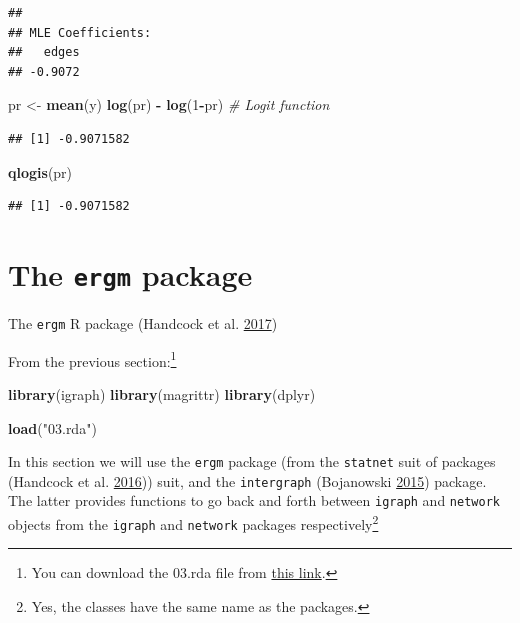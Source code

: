 \documentclass[]{book}
\newenvironment{Shaded}{\begin{snugshade}}{\end{snugshade}}
\newcommand{\KeywordTok}[1]{\textcolor[rgb]{0.13,0.29,0.53}{\textbf{#1}}}
\newcommand{\DecValTok}[1]{\textcolor[rgb]{0.00,0.00,0.81}{#1}}
\newcommand{\StringTok}[1]{\textcolor[rgb]{0.31,0.60,0.02}{#1}}
\newcommand{\CommentTok}[1]{\textcolor[rgb]{0.56,0.35,0.01}{\textit{#1}}}
\newcommand{\OperatorTok}[1]{\textcolor[rgb]{0.81,0.36,0.00}{\textbf{#1}}}
\newcommand{\NormalTok}[1]{#1}
\let\rmarkdownfootnote\footnote%
\def\footnote{\protect\rmarkdownfootnote}
\theoremstyle{definition}
\theoremstyle{definition}
\theoremstyle{definition}
\theoremstyle{remark}
\begin{document}
\begin{verbatim}
## 
## MLE Coefficients:
##   edges  
## -0.9072
\end{verbatim}

\begin{Shaded}
\begin{Highlighting}[]
\NormalTok{pr <-}\StringTok{ }\KeywordTok{mean}\NormalTok{(y)}
\KeywordTok{log}\NormalTok{(pr) }\OperatorTok{-}\StringTok{ }\KeywordTok{log}\NormalTok{(}\DecValTok{1}\OperatorTok{-}\NormalTok{pr) }\CommentTok{# Logit function}
\end{Highlighting}
\end{Shaded}

\begin{verbatim}
## [1] -0.9071582
\end{verbatim}

\begin{Shaded}
\begin{Highlighting}[]
\KeywordTok{qlogis}\NormalTok{(pr)}
\end{Highlighting}
\end{Shaded}

\begin{verbatim}
## [1] -0.9071582
\end{verbatim}

\section{\texorpdfstring{The \texttt{ergm}
package}{The ergm package}}\label{the-ergm-package}

The \texttt{ergm} R package (Handcock et al.
\protect\hyperlink{ref-R-ergm}{2017})

From the previous section:\footnote{You can download the 03.rda file
  from \href{https://github.com/gvegayon/appliedsnar}{this link}.}

\begin{Shaded}
\begin{Highlighting}[]
\KeywordTok{library}\NormalTok{(igraph)}
\KeywordTok{library}\NormalTok{(magrittr)}
\KeywordTok{library}\NormalTok{(dplyr)}

\KeywordTok{load}\NormalTok{(}\StringTok{"03.rda"}\NormalTok{)}
\end{Highlighting}
\end{Shaded}

In this section we will use the \texttt{ergm} package (from the
\texttt{statnet} suit of packages (Handcock et al.
\protect\hyperlink{ref-R-statnet}{2016})) suit, and the
\texttt{intergraph} (Bojanowski
\protect\hyperlink{ref-R-intergraph}{2015}) package. The latter provides
functions to go back and forth between \texttt{igraph} and
\texttt{network} objects from the \texttt{igraph} and \texttt{network}
packages respectively\footnote{Yes, the classes have the same name as
  the packages.}
\end{document}
